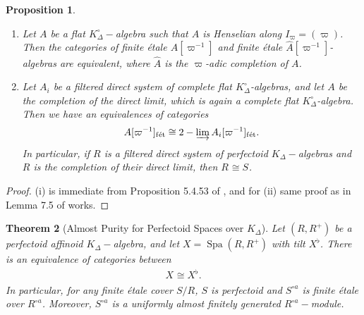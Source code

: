 \documentclass[12pts,a4paper]{amsart}
\newtheorem{proposition}{Proposition}[section]
\newtheorem{theorem}[proposition]{Theorem}
\DeclareMathOperator{\spa}{Spa}
\DeclareMathOperator{\fet}{f\acute{e}t}
\begin{document}
    \begin{proposition}\label{Elkik}
    \begin{enumerate}
        \item[(i)] Let $A$ be a flat $K^\circ_\Delta-$algebra such that $A$ is Henselian along $I_\varpi=(\varpi)$. Then the categories of finite \'etale $A[\varpi^{-1}]$ and finite \'etale $\hat{A}[\varpi^{-1}]$-algebras are equivalent, where $\hat{A}$ is the $\varpi$-adic completion of $A$.
        \item[(ii)] Let $A_i$ be a filtered direct system of complete flat $K^\circ_\Delta$-algebras, and let $A$ be the completion of the direct limit, which is again a complete flat $K^\circ_\Delta$-algebra. Then we have an equivalences of categories
        \begin{align*}
            A[\varpi^{-1}]_{\fet}\cong 2-\varinjlim A_i[\varpi^{-1}]_{\fet}.
        \end{align*}
        In particular, if $R$ is a filtered direct system of perfectoid $K_\Delta-$algebras and $R$ is the completion of their direct limit, then $R_{\fet}\cong S_{\fet}$.
    \end{enumerate}
    \end{proposition}

    \begin{proof}
        (i) is immediate from Proposition 5.4.53 of \cite{ART}, and for (ii) same proof as in Lemma 7.5 of \cite{Sch} works.
    \end{proof}

    \begin{theorem}[Almost Purity for Perfectoid Spaces over $K_\Delta$]
        Let $(R,R^+)$ be a perfectoid affinoid $K_\Delta-$algebra, and let $X=\spa(R,R^+)$ with tilt $X^\flat$. There is an equivalence of categories between
        \begin{align*}
            X_{\fet}\cong X^\flat_{\fet}.
        \end{align*}
        In particular, for any finite \'etale cover $S/R$, $S$ is perfectoid and $S^{\circ a}$ is finite \'etale over $R^{\circ a}$. Moreover, $S^{\circ a}$ is a uniformly almost finitely generated $R^{\circ a}-$module.
    \end{theorem}
\end{document}
